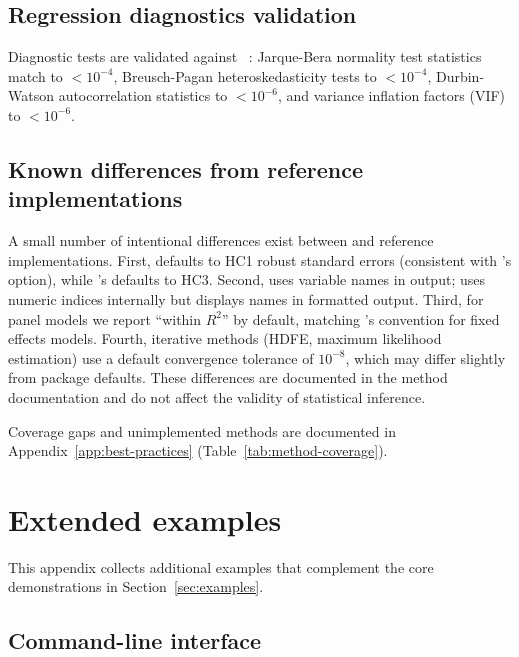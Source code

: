 \subsection{Regression diagnostics validation}

Diagnostic tests are validated against ~\citep{lmtest}:
Jarque-Bera normality test statistics match to $< 10^{-4}$,
Breusch-Pagan heteroskedasticity tests to $< 10^{-4}$,
Durbin-Watson autocorrelation statistics to $< 10^{-6}$, and
variance inflation factors (VIF) to $< 10^{-6}$.

\subsection{Known differences from reference implementations}
\label{app:known-differences}

A small number of intentional differences exist between 
and reference implementations. First,  defaults to
HC1 robust standard errors (consistent with 's  option),
while 's  defaults to HC3. Second, 
uses variable names in output;  uses numeric indices
internally but displays names in formatted output. Third, for panel models
we report ``within $R^2$'' by default, matching 's convention for
fixed effects models. Fourth, iterative methods (HDFE, maximum likelihood estimation) use a default
convergence tolerance of $10^{-8}$, which may differ slightly from
 package defaults. These differences are documented in the
method documentation and do not affect the validity of statistical inference.

\noindent Coverage gaps and unimplemented methods are documented in
Appendix~\ref{app:best-practices} (Table~\ref{tab:method-coverage}).

\section{Extended examples} \label{app:extended-examples}
\setcounter{table}{0}
\setcounter{figure}{0}

This appendix collects additional examples that complement the core
demonstrations in Section~\ref{sec:examples}.

\subsection{Command-line interface} \label{app:cli-examples}

